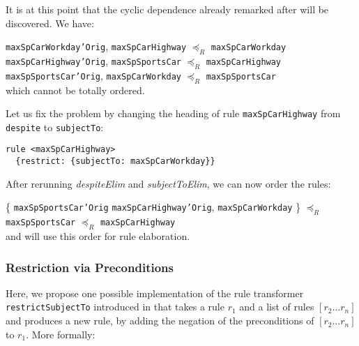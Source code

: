 \begin{example}
It is at this point that the cyclic dependence already remarked after
 will be discovered. We have:

\noindent
\texttt{maxSpCarWorkday'Orig}, \texttt{maxSpCarHighway} $\preceq_R$ \texttt{maxSpCarWorkday}\\
\texttt{maxSpCarHighway'Orig}, \texttt{maxSpSportsCar} $\preceq_R$ \texttt{maxSpCarHighway}\\
\texttt{maxSpSportsCar'Orig}, \texttt{maxSpCarWorkday} $\preceq_R$  \texttt{maxSpSportsCar}\\
\noindent
which cannot be totally ordered.

Let us fix the problem by changing the heading of rule
\texttt{maxSpCarHighway} from \texttt{despite} to \texttt{subjectTo}:
\begin{lstlisting}
rule <maxSpCarHighway>
  {restrict: {subjectTo: maxSpCarWorkday}}
\end{lstlisting}

After rerunning \emph{despiteElim} and \emph{subjectToElim}, we can now order
the rules:


\noindent
\{ \texttt{maxSpSportsCar'Orig}
\texttt{maxSpCarHighway'Orig},
\texttt{maxSpCarWorkday} \} $\preceq_R$
\texttt{maxSpSportsCar} $\preceq_R$
\texttt{maxSpCarHighway}\\
and will use this order for rule elaboration.
\end{example}


\subsubsection{Restriction via Preconditions}\label{sec:restr_precond}

Here, we propose one possible implementation of the rule transformer
\texttt{restrictSubjectTo} introduced in  that takes
a rule $r_1$ and a list of rules $[r_2 \dots r_n]$ and produces a new rule, by
adding the negation of the preconditions of $[r_2 \dots r_n]$ to $r_1$. More
formally:

